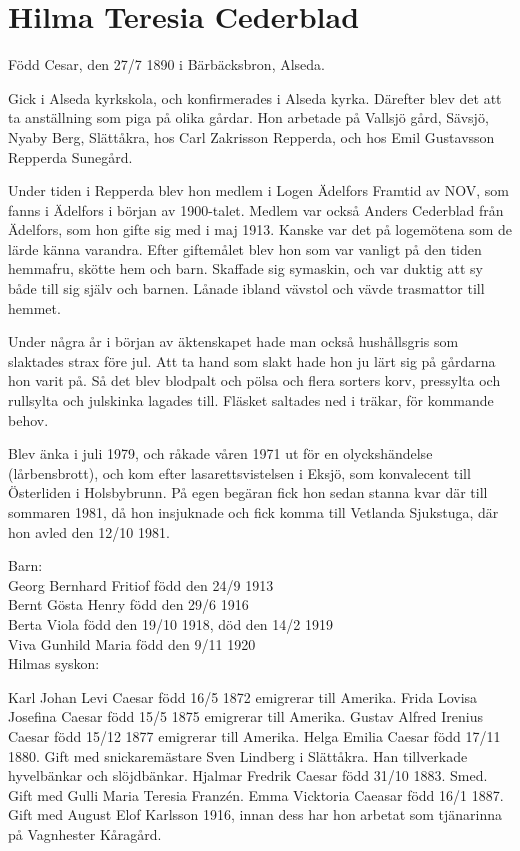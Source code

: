 \chapter{Hilma Teresia Cederblad}
\label{hilma_teresia_cederblad}
Född Cesar, den 27/7 1890 i Bärbäcksbron, Alseda.

Gick i Alseda kyrkskola, och konfirmerades i Alseda kyrka.
Därefter blev det att ta anställning som piga på olika gårdar.
Hon arbetade på Vallsjö gård, Sävsjö, Nyaby Berg, Slättåkra, hos Carl Zakrisson Repperda, och hos Emil Gustavsson Repperda Sunegård.

Under tiden i Repperda blev hon medlem i Logen Ädelfors Framtid av NOV, som fanns i Ädelfors i början av 1900-talet. Medlem var också Anders Cederblad från Ädelfors, som hon gifte sig med i maj 1913. Kanske var det på logemötena som de lärde känna varandra.
Efter giftemålet blev hon som var vanligt på den tiden hemmafru, skötte hem och barn. Skaffade sig symaskin, och var duktig att sy både till sig själv och barnen. Lånade ibland vävstol och vävde trasmattor till hemmet.

Under några år i början av äktenskapet hade man också hushållsgris som slaktades strax före jul. Att ta hand som slakt hade hon ju lärt sig på gårdarna hon varit på. Så det blev blodpalt och pölsa och flera sorters korv, pressylta och rullsylta och julskinka lagades till. Fläsket saltades ned i träkar, för kommande behov.

Blev änka i juli 1979, och råkade våren 1971 ut för en olyckshändelse (lårbensbrott), och kom efter lasarettsvistelsen i Eksjö, som konvalecent till Österliden i Holsbybrunn. På egen begäran fick hon sedan stanna kvar där till sommaren 1981, då hon insjuknade och fick komma till Vetlanda Sjukstuga, där hon avled den 12/10 1981.

\begin{flushleft}
Barn:\\ 
Georg Bernhard Fritiof född den 24/9 1913\\
Bernt Gösta Henry född den 29/6 1916\\
Berta Viola född den 19/10 1918, död den 14/2 1919\\
Viva Gunhild Maria född den 9/11 1920\\


Hilmas syskon:

Karl Johan Levi Caesar född 16/5 1872 emigrerar till Amerika.
Frida Lovisa Josefina Caesar född 15/5 1875 emigrerar till Amerika.
Gustav Alfred Irenius Caesar född 15/12 1877 emigrerar till Amerika.
Helga Emilia Caesar född 17/11 1880. Gift med snickaremästare Sven Lindberg i Slättåkra. Han tillverkade hyvelbänkar och slöjdbänkar.
Hjalmar Fredrik Caesar född 31/10 1883. Smed. Gift med Gulli Maria Teresia Franzén.
Emma Vicktoria Caeasar född 16/1 1887. Gift med August Elof Karlsson 1916, innan dess har hon arbetat som tjänarinna  på Vagnhester Kåragård.
\end{flushleft}
